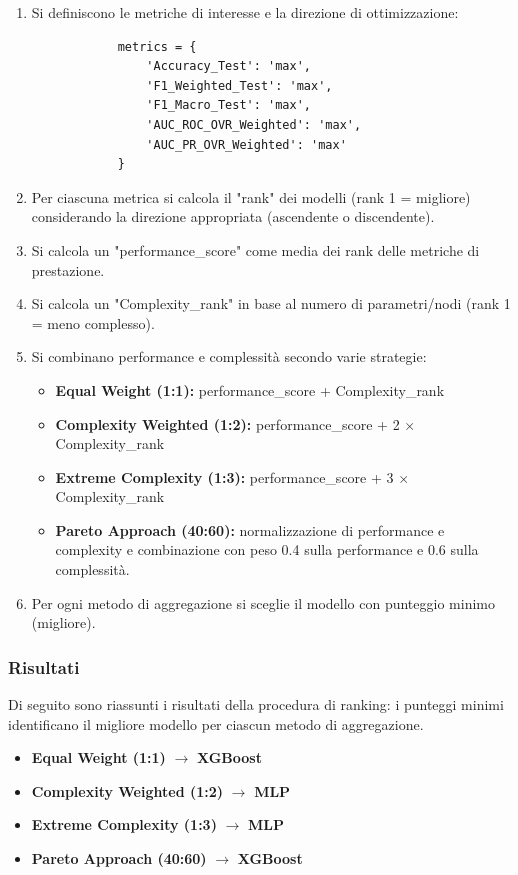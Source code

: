 \documentclass[a4paper,12pt]{report}
\begin{document}
	\begin{enumerate}
		\item Si definiscono le metriche di interesse e la direzione di ottimizzazione:
		\begin{verbatim}
			metrics = {
				'Accuracy_Test': 'max',
				'F1_Weighted_Test': 'max',
				'F1_Macro_Test': 'max',
				'AUC_ROC_OVR_Weighted': 'max',
				'AUC_PR_OVR_Weighted': 'max'
			}
		\end{verbatim}
		\item Per ciascuna metrica si calcola il "rank" dei modelli (rank 1 = migliore) considerando la direzione appropriata (ascendente o discendente).
		\item Si calcola un "performance\_score" come media dei rank delle metriche di prestazione.
		\item Si calcola un "Complexity\_rank" in base al numero di parametri/nodi (rank 1 = meno complesso).
		\item Si combinano performance e complessità secondo varie strategie:
		\begin{itemize}
			\item \textbf{Equal Weight (1:1):} performance\_score + Complexity\_rank
			\item \textbf{Complexity Weighted (1:2):} performance\_score + 2 $\times$ Complexity\_rank
			\item \textbf{Extreme Complexity (1:3):} performance\_score + 3 $\times$ Complexity\_rank
			\item \textbf{Pareto Approach (40:60):} normalizzazione di performance e complexity e combinazione con peso 0.4 sulla performance e 0.6 sulla complessità.
		\end{itemize}
		\item Per ogni metodo di aggregazione si sceglie il modello con punteggio minimo (migliore).
	\end{enumerate}
	
	\subsubsection{Risultati}
	Di seguito sono riassunti i risultati della procedura di ranking: i punteggi minimi identificano il migliore modello per ciascun metodo di aggregazione.
	
	\begin{itemize}
		\item \textbf{Equal Weight (1:1)} $\rightarrow$ \textbf{XGBoost}
		\item \textbf{Complexity Weighted (1:2)} $\rightarrow$ \textbf{MLP}
		\item \textbf{Extreme Complexity (1:3)} $\rightarrow$ \textbf{MLP}
		\item \textbf{Pareto Approach (40:60)} $\rightarrow$ \textbf{XGBoost}
	\end{itemize}
	
\end{document}
